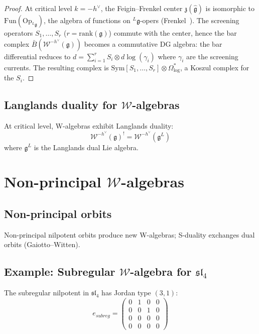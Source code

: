\begin{proof}
At critical level $k = -h^\vee$, the Feigin--Frenkel center $\mathfrak{z}(\widehat{\mathfrak{g}})$ is isomorphic to $\mathrm{Fun}(\mathrm{Op}_{{}^L\!\mathfrak{g}})$, the algebra of functions on ${}^L\!\mathfrak{g}$-opers (Frenkel~\cite{FF}).  The screening operators $S_1, \ldots, S_r$ ($r = \mathrm{rank}(\mathfrak{g})$) commute with the center, hence the bar complex $\bar{B}(\mathcal{W}^{-h^\vee}(\mathfrak{g}))$ becomes a commutative DG algebra: the bar differential reduces to $d = \sum_{i=1}^r S_i \otimes d\log(\gamma_i)$ where $\gamma_i$ are the screening currents.  The resulting complex is $\mathrm{Sym}[S_1, \ldots, S_r] \otimes \Omega^*_{\log}$, a Koszul complex for the $S_i$.
\end{proof}

\subsection{Langlands duality for $\mathcal{W}$-algebras}

\begin{theorem}
\label{thm:frenkel-gaitsgory-langlands}
At critical level, W-algebras exhibit Langlands duality:
\[
\mathcal{W}^{-h^{\vee}}(\mathfrak{g})^! = \mathcal{W}^{-h^{\vee}}(\mathfrak{g}^L)
\]
where $\mathfrak{g}^L$ is the Langlands dual Lie algebra.
\end{theorem}


\section{Non-principal $\mathcal{W}$-algebras}

\subsection{Non-principal orbits}

Non-principal nilpotent orbits produce new W-algebras; S-duality exchanges dual orbits (Gaiotto--Witten).

\subsection{\texorpdfstring{Example: Subregular $\mathcal{W}$-algebra for $\mathfrak{sl}_4$}{Example: Subregular $\mathcal{W}$-algebra for sl 4}}

\begin{definition}
The subregular nilpotent in $\mathfrak{sl}_4$ has Jordan type $(3,1)$:
\[
e_{subreg} = \begin{pmatrix} 0 & 1 & 0 & 0 \\ 0 & 0 & 1 & 0 \\ 0 & 0 & 0 & 0 \\ 0 & 0 & 0 & 0 \end{pmatrix}
\]
\end{definition}

